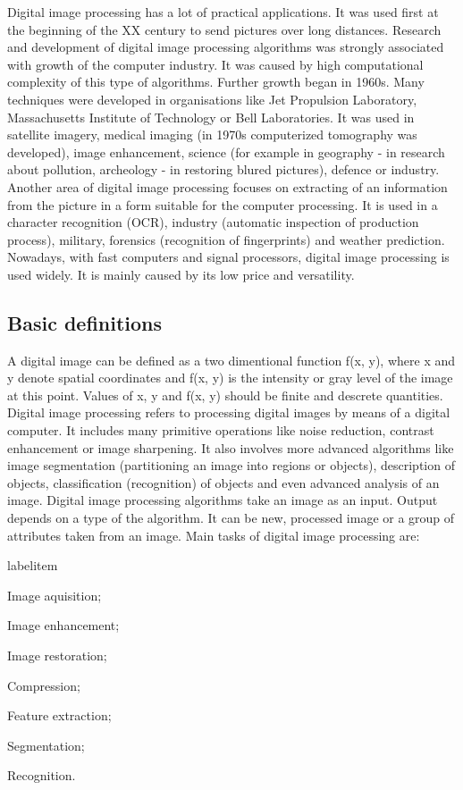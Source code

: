 \documentclass[a4paper,onecolumn,oneside,12pt]{memoir}
\makeatletter
\renewenvironment{itemize}{
  \begin{list}{  
  \csname labelitem\romannumeral\the\@listdepth\endcsname}{
  \setlength{\leftmargin}{1em}
	\setlength{\topsep}{6pt}%
	\setlength{\partopsep}{0pt}%
	\setlength{\parskip}{0pt}%
	\setlength{\parsep}{0pt}%
	\setlength{\itemsep}{0pt}}
}{
  \end{list}
}
\makeatother
\begin{document}
Digital image processing \cite{digitalImageProcessing} has a lot of practical applications. It was
used first at the beginning of the XX century to send pictures over long distances. Research and development of digital image
processing algorithms  was strongly associated with growth of the computer industry. It was caused
by high computational complexity of this type of algorithms. Further growth began in 1960s. Many 
techniques were developed in organisations like Jet Propulsion Laboratory, Massachusetts Institute
of Technology or Bell Laboratories. It was used in satellite imagery, medical imaging (in 1970s 
computerized tomography was developed), image enhancement, science (for example in geography - 
in research about pollution, archeology - in restoring blured pictures), defence or industry.
Another area of digital image processing focuses on extracting of an information from the picture in
a form suitable for the computer processing. It is used in a character recognition (OCR), industry
(automatic inspection of production process), military, forensics (recognition of fingerprints) and
weather prediction. \\

Nowadays, with fast computers and signal processors, digital image processing is used widely.
It is mainly caused by its low price and versatility.

\subsection{Basic definitions}

A digital image can be defined as a two dimentional function f(x, y), where x and y denote spatial 
coordinates and f(x, y) is the intensity or gray level of the image at this point. Values of x, y
and f(x, y) should be finite and descrete quantities. Digital image processing refers to processing 
digital images by means of a digital computer. It includes many primitive operations like noise
reduction, contrast enhancement or image sharpening. It also involves more advanced algorithms like
image segmentation (partitioning an image into regions or objects), description of objects,
classification (recognition) of objects and even advanced analysis of an image. Digital image 
processing algorithms take an image as an input. Output depends on a type of the algorithm.
It can be new, processed image or a group of attributes taken from an image. Main tasks of digital
image processing are:

\begin{itemize}
  \item Image aquisition;
  \item Image enhancement;
  \item Image restoration;
  \item Compression;
  \item Feature extraction;
  \item Segmentation;
  \item Recognition.
\end{itemize}
\end{document}
